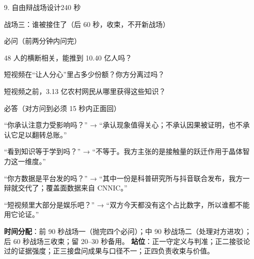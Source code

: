 \documentclass[script,pro]{debate}
\begin{document}
\begin{stage}{9. 自由辩战场设计}{240 秒}
\begin{battleground}{战场三：谁被接住了（后 60 秒，收束，不开新战场）}
\begin{points}{必问（前两分钟内问完）}
\item 48 人的横断相关，能推到 10.40 亿人吗？
\item 短视频在“让人分心”里占多少份额？你方分离过吗？
\item 短视频之前，3.13 亿农村网民从哪里获得这些知识？
\end{points}
\begin{points}{必答（对方问到必须 15 秒内正面回）}
\item “你承认注意力受影响吗？” → “承认现象值得关心；不承认因果被证明，也不承认它足以翻转总账。”
\item “看到知识等于学到吗？” → “不等于。我方主张的是接触量的跃迁作用于晶体智力这一维度。”
\item “你方数据是平台发的吗？” → “其中一份是科普研究所与抖音联合发布，我方一辩就交代了；覆盖面数据来自 CNNIC。”
\item “短视频里大部分是娱乐吧？” → “双方今天都没有这个占比数字，所以谁都不能用它论证。”
\end{points}
\textbf{时间分配}：前 90 秒战场一（抛完四个必问）；中 90 秒战场二（处理对方进攻）；后 60 秒战场三收束；留 20–30 秒备用。
\textbf{站位}：正一守定义与判准；正二接驳论过的证据强度；正三接盘问成果与口径不一；正四负责收束与价值。
\end{battleground}
\end{stage}
\end{document}
